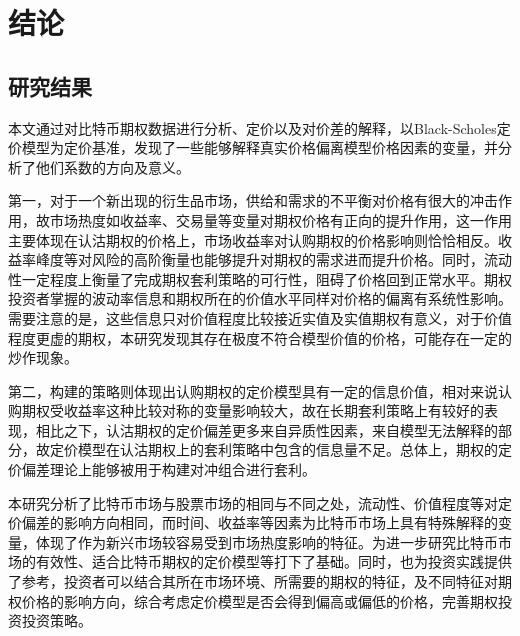 \chapter{结论}
\section{研究结果}
本文通过对比特币期权数据进行分析、定价以及对价差的解释，以Black-Scholes定价模型为定价基准，发现了一些能够解释真实价格偏离模型价格因素的变量，并分析了他们系数的方向及意义。
    \par{第一，对于一个新出现的衍生品市场，供给和需求的不平衡对价格有很大的冲击作用，故市场热度如收益率、交易量等变量对期权价格有正向的提升作用，这一作用主要体现在认沽期权的价格上，市场收益率对认购期权的价格影响则恰恰相反。收益率峰度等对风险的高阶衡量也能够提升对期权的需求进而提升价格。同时，流动性一定程度上衡量了完成期权套利策略的可行性，阻碍了价格回到正常水平。期权投资者掌握的波动率信息和期权所在的价值水平同样对价格的偏离有系统性影响。需要注意的是，这些信息只对价值程度比较接近实值及实值期权有意义，对于价值程度更虚的期权，本研究发现其存在极度不符合模型价值的价格，可能存在一定的炒作现象。}
    \par{第二，构建的策略则体现出认购期权的定价模型具有一定的信息价值，相对来说认购期权受收益率这种比较对称的变量影响较大，故在长期套利策略上有较好的表现，相比之下，认沽期权的定价偏差更多来自异质性因素，来自模型无法解释的部分，故定价模型在认沽期权上的套利策略中包含的信息量不足。总体上，期权的定价偏差理论上能够被用于构建对冲组合进行套利。}
\par{本研究分析了比特币市场与股票市场的相同与不同之处，流动性、价值程度等对定价偏差的影响方向相同，而时间、收益率等因素为比特币市场上具有特殊解释的变量，体现了作为新兴市场较容易受到市场热度影响的特征。为进一步研究比特币市场的有效性、适合比特币期权的定价模型等打下了基础。同时，也为投资实践提供了参考，投资者可以结合其所在市场环境、所需要的期权的特征，及不同特征对期权价格的影响方向，综合考虑定价模型是否会得到偏高或偏低的价格，完善期权投资投资策略。}
